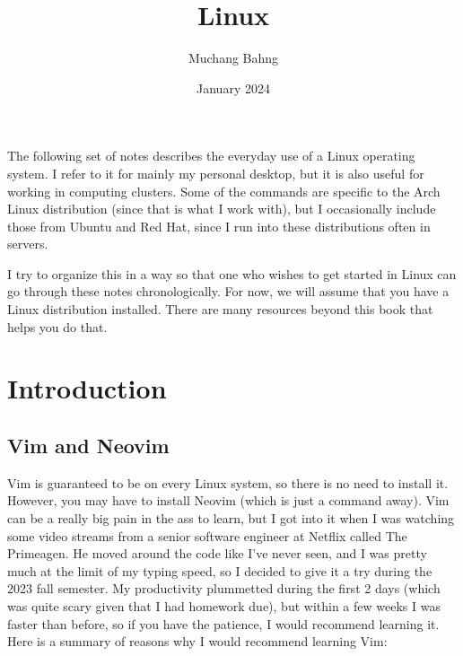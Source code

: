 \documentclass{article}
\begin{document}
\pagestyle{fancy}

\cfoot{\thepage / \pageref{LastPage}}


\title{Linux}
\author{Muchang Bahng}
\date{January 2024}

\maketitle

\tableofcontents

\pagebreak 

The following set of notes describes the everyday use of a Linux operating system. I refer to it for mainly my personal desktop, but it is also useful for working in computing clusters. Some of the commands are specific to the Arch Linux distribution (since that is what I work with), but I occasionally include those from Ubuntu and Red Hat, since I run into these distributions often in servers. 

I try to organize this in a way so that one who wishes to get started in Linux can go through these notes chronologically. For now, we will assume that you have a Linux distribution installed. There are many resources beyond this book that helps you do that. 

\section{Introduction}

  \subsection{Vim and Neovim}

    Vim is guaranteed to be on every Linux system, so there is no need to install it. However, you may have to install Neovim (which is just a command away). Vim can be a really big pain in the ass to learn, but I got into it when I was watching some video streams from a senior software engineer at Netflix called The Primeagen. He moved around the code like I've never seen, and I was pretty much at the limit of my typing speed, so I decided to give it a try during the 2023 fall semester. My productivity plummetted during the first 2 days (which was quite scary given that I had homework due), but within a few weeks I was faster than before, so if you have the patience, I would recommend learning it. Here is a summary of reasons why I would recommend learning Vim: 
    
\end{document}
